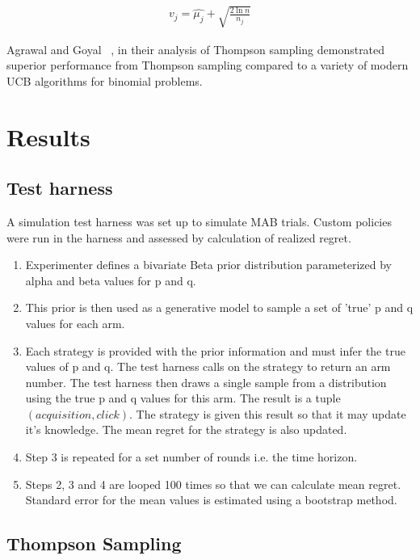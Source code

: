 \documentclass[11pt,a4,singlespacing,titlepagenumber=on]{scrreprt}
\numberwithin{equation}{chapter} %
\theoremstyle{remark}
\begin{document}
\begin{align}
v_j = \hat{\mu_j} + \sqrt{ \frac{2 \ln{n}}{n_j}  }
\end{align}

Agrawal and Goyal ~\cite{DBLP:journals/corr/abs-1111-1797}, in their analysis of Thompson sampling demonstrated superior performance from Thompson sampling compared to a variety of modern UCB algorithms for binomial problems.

\chapter{ Results }

\section{Test harness}

A simulation test harness was set up to simulate MAB trials. Custom policies were run in the harness and assessed by calculation of realized regret.

\begin{enumerate}
	\item Experimenter defines a bivariate Beta prior distribution parameterized by alpha and beta values for p and q.
	\item This prior is then used as a generative model to sample a set of 'true' p and q values for each arm.
	\item Each strategy is provided with the prior information and must infer the true values of p and q. The test harness calls on the strategy to return an arm number. The test harness then draws a single sample from a distribution using the true p and q values for this arm. The result is a tuple $(acquisition,click)$. The strategy is given this result so that it may update it's knowledge. The mean regret for the strategy is also updated.
	\item Step 3 is repeated for a set number of rounds i.e. the time horizon.
	\item Steps 2, 3 and 4 are looped 100 times so that we can calculate mean regret. Standard error for the mean values is estimated using a bootstrap method.
\end{enumerate}





\section{Thompson Sampling}
\end{document}
